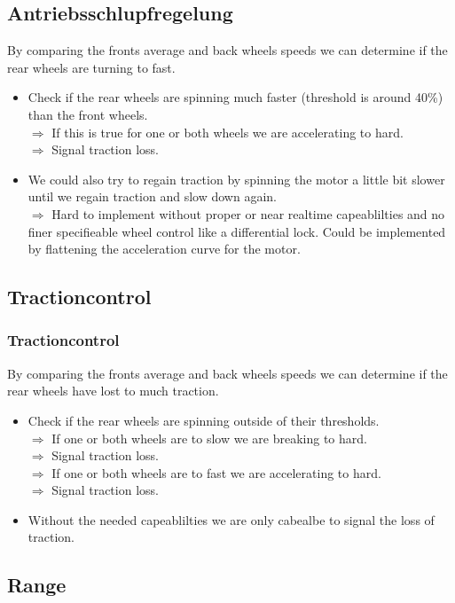 \documentclass{beamer}
\begin{document}
\subsection{Antriebsschlupfregelung}
\begin{frame}
    By comparing the fronts average and back wheels speeds we can determine if the rear wheels are turning to fast. 
    \begin{itemize}
     \item Check if the rear wheels are spinning much faster (threshold is around 40\%) than the front wheels.\\
     $\Rightarrow$ If this is true for one or both wheels we are accelerating to hard.\\
     $\Rightarrow$ Signal traction loss.
     \pause
     \item We could also try to regain traction by spinning the motor a little bit slower until we regain traction and slow down again.\\
     $\Rightarrow$ Hard to implement without proper or near realtime capeablilties and no finer specifieable wheel control like a differential lock. Could be implemented by flattening the acceleration curve for the motor. \\
     \pause
    \end{itemize}
\end{frame}
\subsection{Tractioncontrol}
\begin{frame}
    \frametitle{Tractioncontrol}
    By comparing the fronts average and back wheels speeds we can determine if the rear wheels have lost to much traction.
    \begin{itemize}
     \item Check if the rear wheels are spinning outside of their thresholds.\\
     $\Rightarrow$ If one or both wheels are to slow we are breaking to hard.\\
     $\Rightarrow$ Signal traction loss.\\
     $\Rightarrow$ If one or both wheels are to fast we are accelerating to hard.\\
     $\Rightarrow$ Signal traction loss.
     \pause
     \item Without the needed capeablilties we are only cabealbe to signal the loss of traction.
     \pause
    \end{itemize}
\end{frame}
\subsection{Range}
\begin{frame}
\end{frame}
\end{document}
